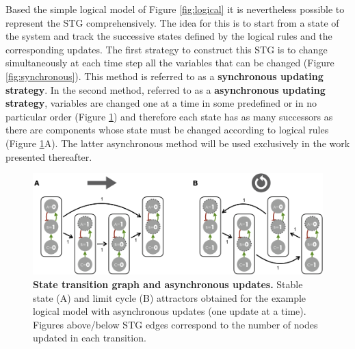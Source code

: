 \documentclass[a4paper,12pt,twoside,onecolumn,openright,final,oldfontcommands]{memoir}
\begin{document}
Based the simple logical model of Figure \ref{fig:logical} it is
nevertheless possible to represent the STG comprehensively. The idea for
this is to start from a state of the system and track the successive
states defined by the logical rules and the corresponding updates. The
first strategy to construct this STG is to change simultaneously at each
time step all the variables that can be changed (Figure
\ref{fig:synchronous}). This method is referred to as a
\textbf{synchronous updating strategy}. In the second method, referred
to as a \textbf{asynchronous updating strategy}, variables are changed
one at a time in some predefined or in no particular order (Figure
\ref{fig:asynchronous}) and therefore each state has as many successors
as there are components whose state must be changed according to logical
rules (Figure \ref{fig:asynchronous}A). The latter asynchronous method
will be used exclusively in the work presented thereafter.

\begin{figure}

{\centering \includegraphics[width=0.9\linewidth]{fig/asynchronous} 

}

\caption[State transition graph and asynchronous updates]{\textbf{State transition graph and
asynchronous updates.} Stable state (A) and limit cycle (B) attractors
obtained for the example logical model with asynchronous updates (one
update at a time). Figures above/below STG edges correspond to the
number of nodes updated in each transition.}\label{fig:asynchronous}
\end{figure}
\end{document}
